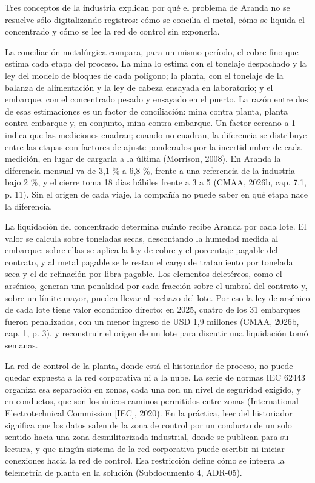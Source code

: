 \documentclass[subdoc]{../../comun/overfore}
\begin{document}
Tres conceptos de la industria explican por qué el problema de Aranda no se resuelve sólo digitalizando registros: cómo se concilia el metal, cómo se liquida el concentrado y cómo se lee la red de control sin exponerla.

La conciliación metalúrgica compara, para un mismo período, el cobre fino que estima cada etapa del proceso. La mina lo estima con el tonelaje despachado y la ley del modelo de bloques de cada polígono; la planta, con el tonelaje de la balanza de alimentación y la ley de cabeza ensayada en laboratorio; y el embarque, con el concentrado pesado y ensayado en el puerto. La razón entre dos de esas estimaciones es un factor de conciliación: mina contra planta, planta contra embarque y, en conjunto, mina contra embarque. Un factor cercano a 1 indica que las mediciones cuadran; cuando no cuadran, la diferencia se distribuye entre las etapas con factores de ajuste ponderados por la incertidumbre de cada medición, en lugar de cargarla a la última (Morrison, 2008). En Aranda la diferencia mensual va de 3,1 \% a 6,8 \%, frente a una referencia de la industria bajo 2 \%, y el cierre toma 18 días hábiles frente a 3 a 5 (CMAA, 2026b, cap. 7.1, p. 11). Sin el origen de cada viaje, la compañía no puede saber en qué etapa nace la diferencia.

La liquidación del concentrado determina cuánto recibe Aranda por cada lote. El valor se calcula sobre toneladas secas, descontando la humedad medida al embarque; sobre ellas se aplica la ley de cobre y el porcentaje pagable del contrato, y al metal pagable se le restan el cargo de tratamiento por tonelada seca y el de refinación por libra pagable. Los elementos deletéreos, como el arsénico, generan una penalidad por cada fracción sobre el umbral del contrato y, sobre un límite mayor, pueden llevar al rechazo del lote. Por eso la ley de arsénico de cada lote tiene valor económico directo: en 2025, cuatro de los 31 embarques fueron penalizados, con un menor ingreso de USD 1,9 millones (CMAA, 2026b, cap. 1, p. 3), y reconstruir el origen de un lote para discutir una liquidación tomó semanas.

La red de control de la planta, donde está el historiador de proceso, no puede quedar expuesta a la red corporativa ni a la nube. La serie de normas IEC 62443 organiza esa separación en zonas, cada una con un nivel de seguridad exigido, y en conductos, que son los únicos caminos permitidos entre zonas (International Electrotechnical Commission [IEC], 2020). En la práctica, leer del historiador significa que los datos salen de la zona de control por un conducto de un solo sentido hacia una zona desmilitarizada industrial, donde se publican para su lectura, y que ningún sistema de la red corporativa puede escribir ni iniciar conexiones hacia la red de control. Esa restricción define cómo se integra la telemetría de planta en la solución (Subdocumento 4, ADR-05).
\end{document}
